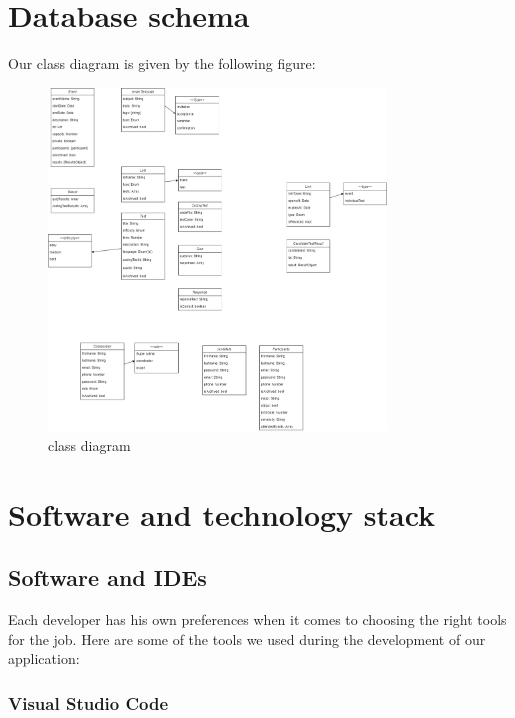 \section{Database schema}
Our class diagram is given by the following figure:
\begin{figure}[hbt!]
      \centering
      \includegraphics[width=0.8\textwidth]{images/mongoose-diagram-Page-1.drawio.png}
      \caption{class diagram}
      \label{fig:class_diagram}
\end{figure}

\section{Software and technology stack}

\subsection{Software and IDEs}
Each developer has his own preferences when it comes to choosing the right
tools for the job. Here are some of the tools we used during the development of
our application:
\subsubsection{Visual Studio Code}

